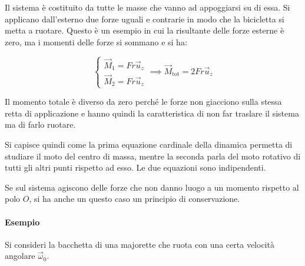 \FloatBarrier
Il sistema è costituito da tutte le masse che vanno ad appoggiarsi su di essa.  Si applicano dall'esterno due forze uguali e contrarie in modo che la bicicletta si metta a ruotare. Questo è un esempio in cui la risultante delle forze esterne è zero, ma i momenti delle forze si sommano e si ha:

\[
	\begin{cases} \vec{M}_1=Fr\vec{u}_z \\ \vec{M}_2=Fr\vec{u}_z \end{cases} \implies \vec{M}_\text{tot}=2Fr\vec{u}_z
\]

Il momento totale è diverso da zero perché le forze non giacciono sulla stessa retta di applicazione e hanno quindi la caratteristica di non far traslare il sistema ma di farlo ruotare.

Si capisce quindi come la prima equazione cardinale della dinamica permetta di studiare il moto del centro di massa, mentre la seconda parla del moto rotativo di tutti gli altri punti rispetto ad esso. Le due equazioni sono indipendenti.

Se sul sistema agiscono delle forze che non danno luogo a un momento rispetto al polo $O$, si ha anche un questo caso un principio di conservazione.

\paragraph{Esempio} Si consideri la bacchetta di una majorette che ruota con una certa velocità angolare $\vec{\omega}_0$.

